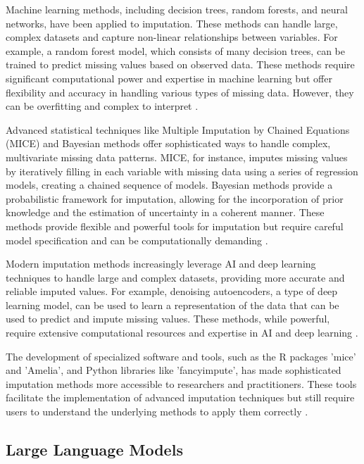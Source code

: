 Machine learning methods, including decision trees, random forests, and neural networks, have been applied to imputation. These methods can handle large, complex datasets and capture non-linear relationships between variables. For example, a random forest model, which consists of many decision trees, can be trained to predict missing values based on observed data. These methods require significant computational power and expertise in machine learning but offer flexibility and accuracy in handling various types of missing data. However, they can be overfitting and complex to interpret \cite{stekhoven2012missforest}.

Advanced statistical techniques like Multiple Imputation by Chained Equations (MICE) and Bayesian methods offer sophisticated ways to handle complex, multivariate missing data patterns. MICE, for instance, imputes missing values by iteratively filling in each variable with missing data using a series of regression models, creating a chained sequence of models. Bayesian methods provide a probabilistic framework for imputation, allowing for the incorporation of prior knowledge and the estimation of uncertainty in a coherent manner. These methods provide flexible and powerful tools for imputation but require careful model specification and can be computationally demanding \cite{Buuren2011MICEMI}.

Modern imputation methods increasingly leverage AI and deep learning techniques to handle large and complex datasets, providing more accurate and reliable imputed values. For example, denoising autoencoders, a type of deep learning model, can be used to learn a representation of the data that can be used to predict and impute missing values. These methods, while powerful, require extensive computational resources and expertise in AI and deep learning \cite{gondara2018mida}.

The development of specialized software and tools, such as the R packages 'mice' and 'Amelia', and Python libraries like 'fancyimpute', has made sophisticated imputation methods more accessible to researchers and practitioners. These tools facilitate the implementation of advanced imputation techniques but still require users to understand the underlying methods to apply them correctly \cite{Buuren2011MICEMI, Honaker2011AmeliaIA}.

\subsection{Large Language Models}

